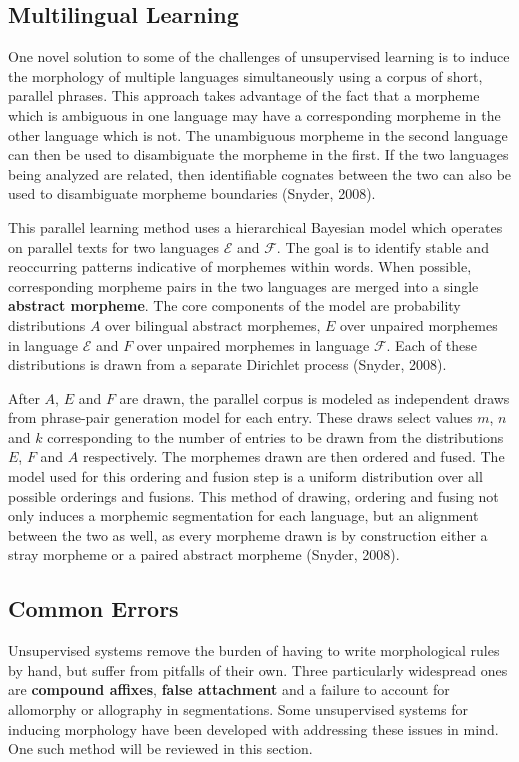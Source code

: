 \documentclass[12pt]{article}
\begin{document}
\subsection{Multilingual Learning}
One novel solution to some of the challenges of unsupervised learning is to induce the morphology of multiple languages simultaneously using a corpus of short, parallel phrases. This approach takes advantage of the fact that a morpheme which is ambiguous in one language may have a corresponding morpheme in the other language which is not. The unambiguous morpheme in the second language can then be used to disambiguate the morpheme in the first. If the two languages being analyzed are related, then identifiable cognates between the two can also be used to disambiguate morpheme boundaries (Snyder, 2008).

This parallel learning method uses a hierarchical Bayesian model which operates on parallel texts for two languages $\mathcal{E}$ and $\mathcal{F}$. The goal is to identify stable and reoccurring patterns indicative of morphemes within words. When possible, corresponding morpheme pairs in the two languages are merged into a single \textbf{abstract morpheme}. The core components of the model are probability distributions $A$ over bilingual abstract morphemes, $E$ over unpaired morphemes in language $\mathcal{E}$ and $F$ over unpaired morphemes in language $\mathcal{F}$. Each of these distributions is drawn from a separate Dirichlet process (Snyder, 2008).

After $A$, $E$ and $F$ are drawn, the parallel corpus is modeled as independent draws from phrase-pair generation model for each entry. These draws select values $m$, $n$ and $k$ corresponding to the number of entries to be drawn from the distributions $E$, $F$ and $A$ respectively. The morphemes drawn are then ordered and fused. The model used for this ordering and fusion step is a uniform distribution over all possible orderings and fusions. This method of drawing, ordering and fusing not only induces a morphemic segmentation for each language, but an alignment between the two as well, as every morpheme drawn is by construction either a stray morpheme or a paired abstract morpheme (Snyder, 2008).

\subsection{Common Errors}
Unsupervised systems remove the burden of having to write morphological rules by hand, but suffer from pitfalls of their own. Three particularly widespread ones are \textbf{compound affixes}, \textbf{false attachment} and a failure to account for allomorphy or allography in segmentations. Some unsupervised systems for inducing morphology have been developed with addressing these issues in mind. One such method will be reviewed in this section.
\end{document}
